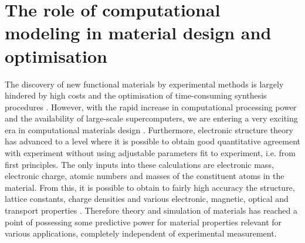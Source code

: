 \documentclass[11pt, twoside]{report}
\begin{document}
\section{The role of computational modeling in material design and optimisation}
The discovery of new functional materials by experimental methods is largely hindered by high costs and the optimisation of time-consuming synthesis procedures \cite{high_tp}.
However, with the rapid increase in computational processing power and the availability of large-scale supercomputers, we are entering a very exciting era in computational materials design \cite{WMD_material_design_review}. Furthermore, electronic structure theory has advanced to a level where it is possible to obtain good quantitative agreement with experiment without using adjustable parameters fit to experiment, i.e. from first principles. The only inputs into these calculations are electronic mass, electronic charge, atomic numbers and masses of the constituent atoms in the material. From this, it is possible to obtain to fairly high accuracy the structure, lattice constants, charge densities and various electronic, magnetic, optical and transport properties \cite{elec_structure_theory}. Therefore theory and simulation of materials has reached a point of possessing some predictive power for material properties relevant for various applications, completely independent of experimental measurement.
\end{document}
